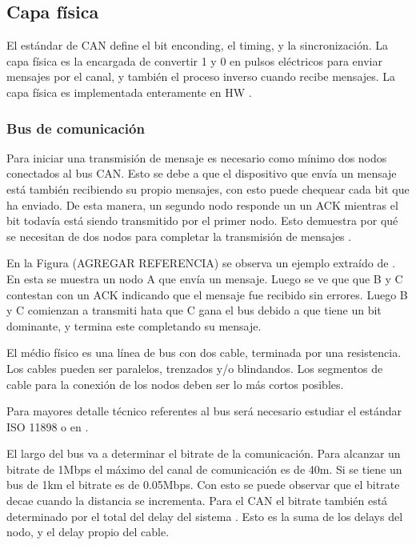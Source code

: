 \subsection{Capa física}
El estándar de CAN define el bit enconding, el timing, y la sincronización. La capa física es la encargada de convertir 1 y 0 en pulsos eléctricos para enviar mensajes por el canal, y también el proceso inverso cuando recibe mensajes. La capa física es implementada enteramente en \ac{HW} \citep{texasFISICACAN}.

\subsubsection{Bus de comunicación}
Para iniciar una transmisión de mensaje es necesario como mínimo dos nodos conectados al bus CAN. Esto se debe a que el dispositivo que envía un mensaje está también recibiendo su propio mensajes, con esto puede chequear cada bit que ha enviado. De esta manera, un segundo nodo responde un un ACK mientras el bit todavía está siendo transmitido por el primer nodo. Esto demuestra por qué se necesitan de dos nodos para completar la transmisión de mensajes \citep{texasFISICACAN}.

En la Figura (AGREGAR REFERENCIA) se observa un ejemplo extraído de \citep{texasFISICACAN}. En esta se muestra un nodo A que envía un mensaje. Luego se ve que que B y C contestan con un ACK indicando que el mensaje fue recibido sin errores. Luego B y C comienzan a transmiti hata que C gana el bus debido a que tiene un bit dominante, y termina este completando su mensaje.


El médio físico  es una línea de bus con dos cable, terminada por una resistencia. Los cables pueden ser paralelos, trenzados y/o blindandos. Los segmentos de cable para la conexión de los nodos deben ser lo más cortos posibles. 

Para mayores detalle técnico referentes al bus será necesario estudiar el estándar ISO 11898 o en \cite{texasFISICACAN}.

El largo del bus va a determinar el bitrate de la comunicación. Para alcanzar un bitrate de 1Mbps el máximo del canal de comunicación es de 40m. Si se tiene un bus de 1km el bitrate es de 0.05Mbps. Con esto se puede observar que el bitrate decae cuando la distancia se incrementa. Para el CAN el bitrate también está determinado por el total del delay del sistema \citep{texasFISICACAN}. Esto es la suma de los delays del nodo, y el delay propio del cable.

